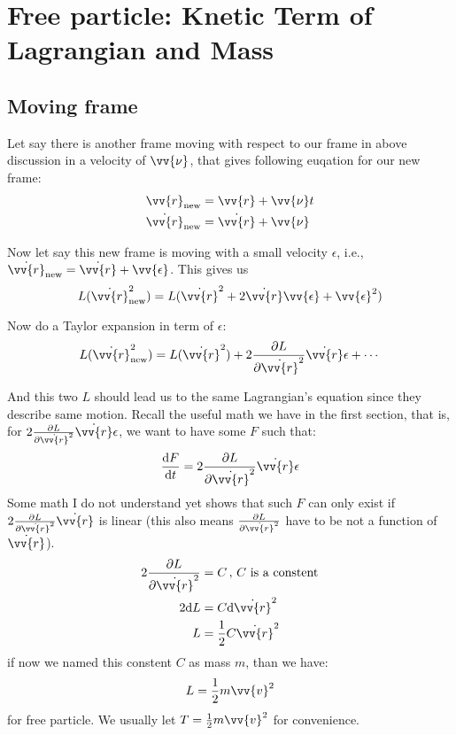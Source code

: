 \documentclass{article}
\newcommand{\de}{\mathrm{d}}
\begin{document}
\section{Free particle: Knetic Term of Lagrangian and Mass}

\subsection{Moving frame}

Let say there is another frame moving with respect to our frame in above discussion in a velocity of $\vv{\nu}$, that gives following euqation for our new frame:
\begin{align*}
    \vv{r}_\text{new} &= \vv{r} + \vv{\nu}t \\
    \dot{\vv{r}}_\text{new} &= \dot{\vv{r}} + \vv{\nu}
\end{align*}

Now let say this new frame is moving with a small velocity $\epsilon$, i.e., $\dot{\vv{r}}_\text{new} = \dot{\vv{r}} + \vv{\epsilon}$. This gives us
\[
L (\dot{\vv{r}}_\text{new}^2)= L (\dot{\vv{r}}^2 + 2\dot{\vv{r}}\vv{\epsilon} + \vv{\epsilon}^2)
\]

Now do a Taylor expansion in term of $\epsilon$:
\[
L (\dot{\vv{r}}_\text{new}^2) = L(\dot{\vv{r}}^2) + 2 \frac{\partial L}{\partial \dot{\vv{r}}^2} \dot{\vv{r}} \epsilon + \cdots
\]

And this two $L$ should lead us to the same Lagrangian's equation since they describe same motion. Recall the useful math we have in the first section, that is, for $2 \frac{\partial L}{\partial \dot{\vv{r}}^2} \dot{\vv{r}} \epsilon$, we want to have some $F$ such that:
\[
\frac{\de F}{\de t} = 2 \frac{\partial L}{\partial \dot{\vv{r}}^2} \dot{\vv{r}} \epsilon
\]
Some math I do not understand yet shows that such $F$ can only exist if $2 \frac{\partial L}{\partial \dot{\vv{r}}^2} \dot{\vv{r}}$ is linear (this also means $\frac{\partial L}{\partial \dot{\vv{r}}^2}$ have to be not a function of $\dot{\vv{r}}$).
\begin{align*}
    2\frac{\partial L}{\partial \dot{\vv{r}}^2} &= C \,,\, C\text{ is a constent}\\
    2 \de L &= C \de \dot{\vv{r}}^2 \\
    L &= \frac{1}{2}C \dot{\vv{r}}^2
\end{align*}
if now we named this constent $C$ as mass $m$, than we have:
\[
L = \frac{1}{2} m \vv{v}^2
\]
for free particle. We usually let $T = \frac{1}{2} m \vv{v}^2$ for convenience.
\end{document}
